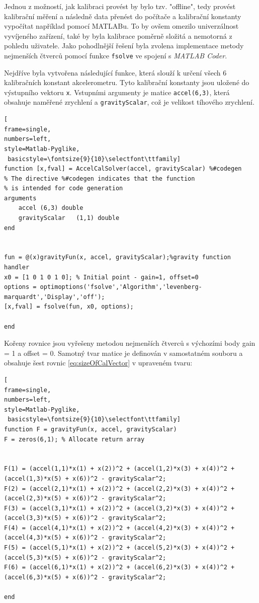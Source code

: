 Jednou z možností, jak kalibraci provést by bylo tzv. "offline", tedy provést kalibrační měření a následně data přenést do počítače a kalibrační konstanty vypočítat například pomocí MATLABu. To by ovšem omezilo univerzálnost vyvíjeného zařízení, také by byla kalibrace poměrně složitá a nemotorná z pohledu uživatele. Jako pohodlnější řešení byla zvolena implementace metody nejmenších čtverců pomocí funkce \texttt{fsolve} ve spojení s \emph{MATLAB Coder}.

Nejdříve byla vytvořena následující funkce, která slouží k určení všech 6 kalibračních konstant akcelerometru. Tyto kalibrační konstanty jsou uložené do výstupního vektoru \texttt{x}. Vstupními argumenty je matice \texttt{accel(6,3)}, která obsahuje naměřené zrychlení a \texttt{gravityScalar}, což je velikost tíhového zrychlení.

\begin{lstlisting}[
frame=single,
numbers=left,
style=Matlab-Pyglike,
 basicstyle=\fontsize{9}{10}\selectfont\ttfamily]
function [x,fval] = AccelCalSolver(accel, gravityScalar) %#codegen
% The directive %#codegen indicates that the function
% is intended for code generation
arguments
    accel (6,3) double
    gravityScalar   (1,1) double
end


fun = @(x)gravityFun(x, accel, gravityScalar);%gravity function handler
x0 = [1 0 1 0 1 0]; % Initial point - gain=1, offset=0
options = optimoptions('fsolve','Algorithm','levenberg-marquardt','Display','off');
[x,fval] = fsolve(fun, x0, options);

end
\end{lstlisting}

Kořeny rovnice jsou vyřešeny metodou nejmenších čtverců s výchozími body gain = 1 a offset = 0. Samotný tvar matice je definován v samostatném souboru a obsahuje šest rovnic \ref{eq:sizeOfCalVector} v upraveném tvaru:
\begin{lstlisting}[
frame=single,
numbers=left,
style=Matlab-Pyglike,
 basicstyle=\fontsize{9}{10}\selectfont\ttfamily]
function F = gravityFun(x, accel, gravityScalar)
F = zeros(6,1); % Allocate return array


F(1) = (accel(1,1)*x(1) + x(2))^2 + (accel(1,2)*x(3) + x(4))^2 + (accel(1,3)*x(5) + x(6))^2 - gravityScalar^2;
F(2) = (accel(2,1)*x(1) + x(2))^2 + (accel(2,2)*x(3) + x(4))^2 + (accel(2,3)*x(5) + x(6))^2 - gravityScalar^2;
F(3) = (accel(3,1)*x(1) + x(2))^2 + (accel(3,2)*x(3) + x(4))^2 + (accel(3,3)*x(5) + x(6))^2 - gravityScalar^2;
F(4) = (accel(4,1)*x(1) + x(2))^2 + (accel(4,2)*x(3) + x(4))^2 + (accel(4,3)*x(5) + x(6))^2 - gravityScalar^2;
F(5) = (accel(5,1)*x(1) + x(2))^2 + (accel(5,2)*x(3) + x(4))^2 + (accel(5,3)*x(5) + x(6))^2 - gravityScalar^2;
F(6) = (accel(6,1)*x(1) + x(2))^2 + (accel(6,2)*x(3) + x(4))^2 + (accel(6,3)*x(5) + x(6))^2 - gravityScalar^2;

end
\end{lstlisting}

